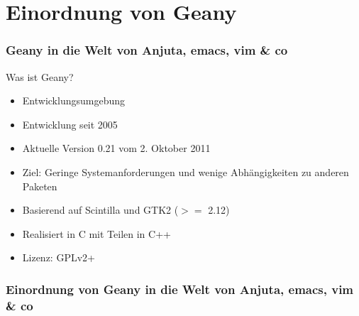 \section[Einordnung]{Einordnung von Geany}
\begin{frame}
	\frametitle{Geany in die Welt von Anjuta, emacs, vim \& co}
	\begin{block}{Was ist Geany?}
		\begin{itemize}
			\item Entwicklungsumgebung
			\item Entwicklung seit 2005
			\item Aktuelle Version 0.21 vom 2. Oktober 2011
			\item Ziel: Geringe Systemanforderungen und wenige
				  Abhängigkeiten zu anderen Paketen
			\item Basierend auf Scintilla und GTK2 ($>=$ 2.12)
			\item Realisiert in C mit Teilen in C++
			\item Lizenz: GPLv2+
		\end{itemize}
	\end{block}
\end{frame}

\begin{frame}
	\frametitle{Einordnung von Geany in die Welt von Anjuta, emacs, vim \& co}
	\begin{figure}[ht]
		\centering
 		\footnotesize
		
	\end{figure}
\end{frame}
